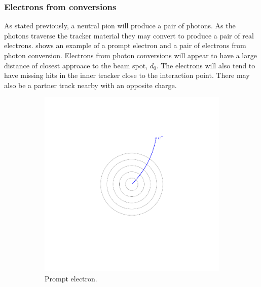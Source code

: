 \subsubsection{Electrons from conversions}
As stated previously, a neutral pion will produce a pair of photons. As the
photons traverse the tracker material they may convert to produce a pair of real
electrons\cite{nikos,barge2009conversion}.
 shows an example of a prompt electron and a pair of
electrons from photon conversion.  Electrons from photon conversions will appear
to have a large distance of closest approace to the beam spot, $d_0$.
The electrons will also tend to have missing hits in the inner tracker close to
the interaction point.
There may also be a partner track nearby with an opposite charge.
\begin{figure}[htbp]
  \centering
  \begin{subfigure}{0.49\textwidth}
    \centering
    \includegraphics[trim = 35mm 40mm 30mm 30mm, clip,width=\textwidth]{doca_electron}
    \caption{Prompt electron.}
    \label{fig:electron_path}
  \end{subfigure}
  \begin{subfigure}{0.49\textwidth}
    \centering

\end{subfigure}
\end{figure}
